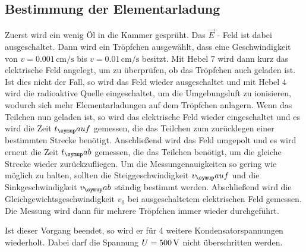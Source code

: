 \subsection{Bestimmung der Elementarladung}
Zuerst wird ein wenig Öl in die Kammer gesprüht. Das $\vec{E}$ - Feld ist dabei
ausgeschaltet. Dann wird ein Tröpfchen ausgewählt, dass eine Geschwindigkeit von
$v = 0.001\,\si{\centi\meter\per\second}$ bis $v = 0.01\,\si{\centi\meter\per\second}$
besitzt. Mit Hebel $7$ wird dann kurz das elektrische Feld angelegt, um zu überprüfen,
ob das Tröpfchen auch geladen ist. Ist dies nicht der Fall, so wird das Feld wieder
ausgeschaltet und mit Hebel $4$ wird die radioaktive Quelle eingeschaltet, um die
Umgebungsluft zu ionisieren, wodurch sich mehr Elementarladungen auf dem Tröpfchen
anlagern. Wenn das Teilchen nun geladen ist, so wird das elektrische Feld wieder
eingeschaltet und es wird die Zeit $t_\su{auf}$ gemessen, die das Teilchen zum zurücklegen einer
bestimmten Strecke benötigt. Anschließend wird das Feld umgepolt und es wird erneut
die Zeit $t_\su{ab}$ gemessen, die das Teilchen benötigt, um die gleiche Strecke wieder
zurückzufliegen. Um die Messungenauigkeiten so gering wie möglich zu halten, sollten die
Steiggeschwindigkeit $v_\su{auf}$ und die Sinkgeschwindigkeit $v_\su{ab}$ ständig
bestimmt werden. Abschließend wird die Gleichgewichtsgeschwindigkeit $v_0$ bei
ausgeschaltetem elektrischen Feld gemessen. Die Messung wird dann für mehrere
Tröpfchen immer wieder durchgeführt.

Ist dieser Vorgang beendet, so wird er für 4 weitere Kondensatorspannungen
wiederholt. Dabei darf die Spannung $U=500\,\si{\volt}$ nicht überschritten werden.
